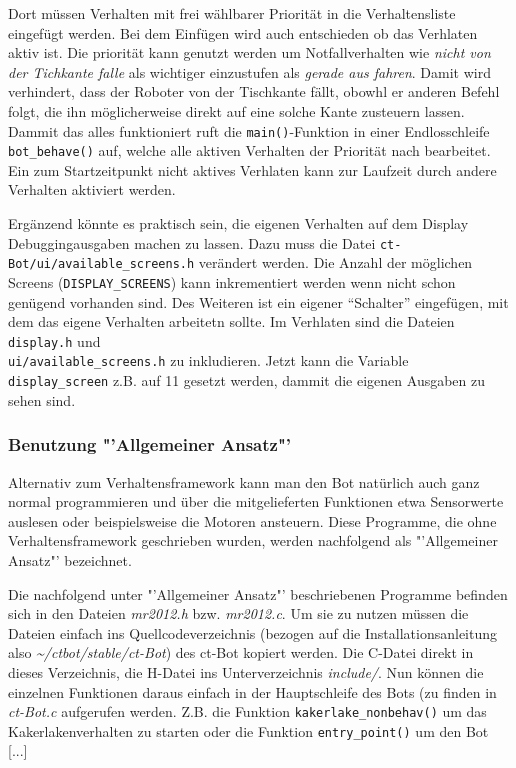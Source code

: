 Dort müssen Verhalten mit frei wählbarer Priorität in die Verhaltensliste
eingefügt werden. Bei dem Einfügen wird auch entschieden ob das Verhlaten
aktiv ist. Die priorität kann genutzt werden um Notfallverhalten wie
\textit{nicht von der Tichkante falle} als wichtiger einzustufen als
\textit{gerade aus fahren}. Damit wird verhindert, dass der Roboter von der
Tischkante fällt, obowhl er anderen Befehl folgt, die ihn möglicherweise
direkt auf eine solche Kante zusteuern lassen. Dammit das alles funktioniert
ruft die \verb+main()+-Funktion in einer Endlosschleife \verb+bot_behave()+ auf,
welche alle aktiven Verhalten der Priorität nach bearbeitet. Ein zum
Startzeitpunkt nicht aktives Verhlaten kann zur Laufzeit durch andere Verhalten
aktiviert werden.

Ergänzend könnte es praktisch sein, die eigenen Verhalten auf dem Display
Debuggingausgaben machen zu lassen. Dazu muss die Datei
\verb+ct-Bot/ui/available_screens.h+ verändert werden. Die Anzahl
der möglichen Screens (\verb+DISPLAY_SCREENS+) kann inkrementiert werden
wenn nicht schon genügend vorhanden sind. Des Weiteren ist ein eigener
"`Schalter"' eingefügen, mit dem das eigene Verhalten arbeitetn sollte.
Im Verhlaten sind die Dateien \verb+display.h+ und \\
\verb+ui/available_screens.h+ zu inkludieren. Jetzt kann die Variable
\verb+display_screen+ z.B. auf 11 gesetzt werden, dammit die eigenen
Ausgaben zu sehen sind. \\

\subsubsection{Benutzung "'Allgemeiner Ansatz"'}
\label{benutzung_allgemein}
Alternativ zum Verhaltensframework kann man den Bot natürlich auch ganz normal programmieren und über die mitgelieferten Funktionen etwa Sensorwerte auslesen oder beispielsweise die Motoren ansteuern. Diese Programme, die ohne Verhaltensframework geschrieben wurden, werden nachfolgend als "'Allgemeiner Ansatz"' bezeichnet.

Die nachfolgend unter "'Allgemeiner Ansatz"' beschriebenen Programme befinden sich in den Dateien \textit{mr2012.h} bzw. \textit{mr2012.c}. Um sie zu nutzen müssen die Dateien einfach ins Quellcodeverzeichnis (bezogen auf die Installationsanleitung also \textit{\~{}/ctbot/stable/ct-Bot}) des ct-Bot kopiert werden. Die C-Datei direkt in dieses Verzeichnis, die H-Datei ins Unterverzeichnis \textit{include/}.
Nun können die einzelnen Funktionen daraus einfach in der Hauptschleife des Bots (zu finden in \textit{ct-Bot.c} aufgerufen werden. 
Z.B. die Funktion \verb+kakerlake_nonbehav()+ um das Kakerlakenverhalten zu starten oder die Funktion \verb+entry_point()+ um den Bot [...]